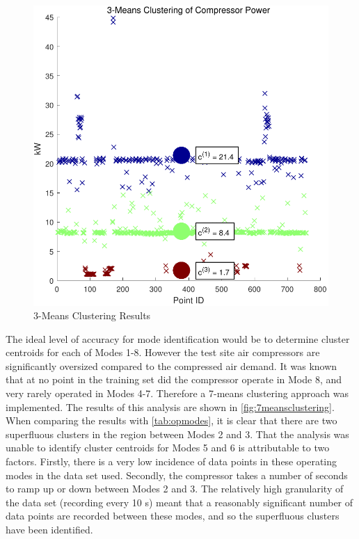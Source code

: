 \begin{figure}
\includegraphics[width = \columnwidth]{./Images/3MeansClustering.pdf}
\caption{3-Means Clustering Results}
\label{fig:3meansclustering}
\end{figure}

The ideal level of accuracy for mode identification would be to determine cluster centroids for each of Modes 1-8. However the test site air compressors are significantly oversized compared to the compressed air demand. It was known that at no point in the training set did the compressor operate in Mode 8, and very rarely operated in Modes 4-7. Therefore a 7-means clustering approach was implemented. The results of this analysis are shown in \autoref{fig:7meansclustering}. When comparing the results with \autoref{tab:opmodes}, it is clear that there are two superfluous clusters in the region between Modes 2 and 3. That the analysis was unable to identify cluster centroids for Modes 5 and 6 is attributable to two factors. Firstly, there is a very low incidence of data points in these operating modes in the data set used. Secondly, the compressor takes a number of seconds to ramp up or down between Modes 2 and 3. The relatively high granularity of the data set (recording every 10 s) meant that a reasonably significant number of data points are recorded between these modes, and so the superfluous clusters have been identified.

